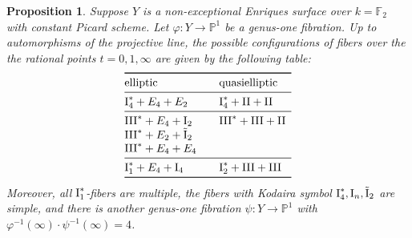 \documentclass[oneside, 12pt]{amsart}
\newcommand\mylabel[1]{\label{#1}\marginpar{\vspace{-1ex}\medskip\medskip\footnotesize \tt #1}}
\renewcommand\mylabel[1]{\label{#1}}
\newtheorem{proposition}[theorem]{Proposition}
\theoremstyle{definition}
\theoremstyle{remark}
\newcommand{\FF}{\mathbb{F}}
\newcommand{\PP}{\mathbb{P}}
\newcommand{\I}{\text{\rm I}}
\newcommand{\II}{\text{\rm II}}
\newcommand{\III}{\text{\rm III}}
\newcommand{\tI}{\text{\rm \~{I}}}
\newcommand{\ra}{\rightarrow}
\newcommand{\inv}{{-1}}
\begin{document}
\begin{proposition}
\mylabel{key reduction}
Suppose $Y$ is a non-exceptional Enriques surface over $k=\FF_2$ with constant Picard scheme.
Let $\varphi:Y\ra\PP^1$ be a genus-one fibration.
Up to  automorphisms of the projective line,
the possible configurations of fibers over the the rational points $t=0,1,\infty$ are given by
the following table:
$$
\begin{array}[c]{@{}lll}
\toprule
\text{elliptic}		& 		& \text{quasielliptic}\\
\midrule
\I_4^* +E_4+E_2		&		& \I_4^*+\II+\II\\
\midrule
\III^*+E_4+\I_2		&		& \III^*+\III+\II\\ 
\III^*+E_2+\tI_2\\
\III^*+E_4+E_4\\
\midrule
\I_1^*+E_4+\I_4	&		& \I_2^*+\III+\III\\
\bottomrule
\end{array}
$$
Moreover,   all $\I_1^*$-fibers are multiple, the fibers with Kodaira symbol  $\I_4^*,\I_n,\tI_2$ are simple,
and   there is another genus-one fibration
$\psi:Y\ra\PP^1$ with $\varphi^\inv(\infty)\cdot \psi^\inv(\infty)=4$.
\end{proposition}
\end{document}
